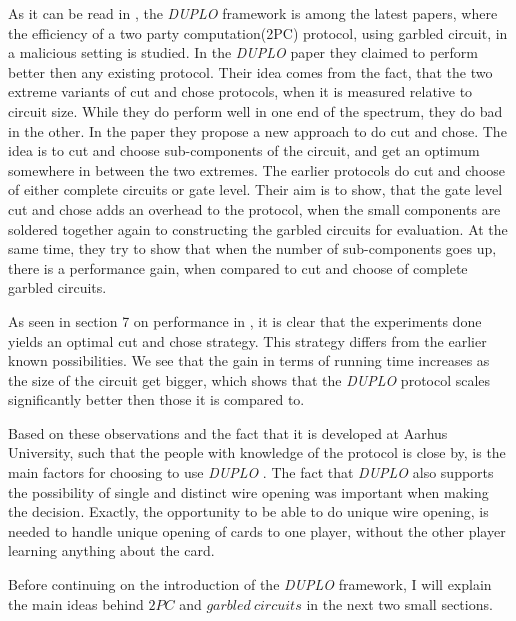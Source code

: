 \documentclass[twoside,11pt,openright]{report}
\newcommand{\DUPLO}{\textit{DUPLO} }
\begin{document}
\bigskip

As it can be read in \cite{duplo}, the \DUPLO framework is among the latest papers, where the efficiency of a two party computation(2PC) protocol, using garbled circuit, in a malicious setting is studied. In the \DUPLO paper they claimed to perform better then any existing protocol. Their idea comes from the fact, that the two extreme variants of cut and chose protocols, when it is measured relative to circuit size. While they do perform well in one end of the spectrum, they do bad in the other. In the paper they propose a new approach to do cut and chose. The idea is to cut and choose sub-components of the circuit, and get an optimum somewhere in between the two extremes. The earlier protocols do cut and choose of either complete circuits or gate level. Their aim is to show, that the gate level cut and chose adds an overhead to the protocol, when the small components are soldered together again to constructing the garbled circuits for evaluation. At the same time, they try to show that when the number of sub-components goes up, there is a performance gain, when compared to cut and choose of complete garbled circuits.

As seen in section 7 on performance in \cite{duplo}, it is clear that the experiments done yields an optimal cut and chose strategy. This strategy differs from the earlier known possibilities. We see that the gain in terms of running time increases as the size of the circuit get bigger, which shows that the \DUPLO protocol scales significantly better then those it is compared to.

\bigskip

Based on these observations and the fact that it is developed at Aarhus University, such that the people with knowledge of the protocol is close by, is the main factors for choosing to use \DUPLO. The fact that \DUPLO also supports the possibility of single and distinct wire opening was important when making the decision. Exactly, the opportunity to be able to do unique wire opening, is needed to handle unique opening of cards to one player, without the other player learning anything about the card.

\bigskip

Before continuing on the introduction of the \DUPLO framework, I will explain the main ideas behind $2PC$ and $garbled~circuits$ in the next two small sections.

\bigskip
\end{document}
